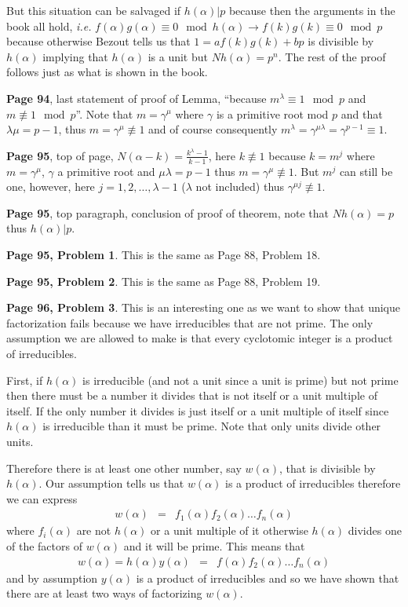 \documentclass[aps,preprint,preprintnumbers,nofootinbib,showpacs,prd]{revtex4-1}
\newcommand{\ie}{{\it i.e.} }
\newcommand{\nbea}{\begin{eqnarray*}}
\newcommand{\neea}{\end{eqnarray*}}
\begin{document}
But this situation can be salvaged if $h(\alpha)|p$ because then the arguments in the book all hold, \ie $f(\alpha)g(\alpha) \equiv 0 \mod{h(\alpha)} \to f(k)g(k) \equiv 0 \mod{p}$ because otherwise Bezout tells us that $1 = af(k)g(k) + bp$ is divisible by $h(\alpha)$ implying that $h(\alpha)$ is a unit but $Nh(\alpha) = p^n$. The rest of the proof follows just as what is shown in the book.

{\bf Page 94}, last statement of proof of Lemma, ``because $m^\lambda \equiv 1 \mod{p}$ and $m\not\equiv 1 \mod{p}$''. Note that $m = \gamma^\mu$ where $\gamma$ is a primitive root mod $p$ and that $\lambda\mu = p - 1$, thus $m = \gamma^\mu \not\equiv 1$ and of course consequently $m^\lambda = \gamma^{\mu\lambda} = \gamma^{p-1} \equiv 1$.

{\bf Page 95}, top of page, $N(\alpha - k) = \frac{k^\lambda - 1}{k-1}$, here $k \not \equiv 1$ because $k = m^j$ where $m = \gamma^\mu$, $\gamma$ a primitive root and $\mu\lambda = p-1$ thus $m = \gamma^\mu \not\equiv 1$. But $m^j$ can still be one, however, here $j = 1,2,\dots,\lambda - 1$ ($\lambda$ not included) thus $\gamma^{\mu j} \not\equiv 1$.

{\bf Page 95}, top paragraph, conclusion of proof of theorem, note that $Nh(\alpha) = p$ thus $h(\alpha)|p$.

{\bf Page 95, Problem 1}. This is the same as Page 88, Problem 18.

{\bf Page 95, Problem 2}. This is the same as Page 88, Problem 19.

{\bf Page 96, Problem 3}. This is an interesting one as we want to show that unique factorization fails because we have irreducibles that are not prime. The only assumption we are allowed to make is that every cyclotomic integer is a product of irreducibles.

First, if $h(\alpha)$ is irreducible (and not a unit since a unit is prime) but not prime then there must be a number it divides that is not itself or a unit multiple of itself. If the only number it divides is just itself or a unit multiple of itself since $h(\alpha)$ is irreducible than it must be prime. Note that only units divide other units.

Therefore there is at least one other number, say $w(\alpha)$, that is divisible by $h(\alpha)$. Our assumption tells us that $w(\alpha)$ is a product of irreducibles therefore we can express
%
\nbea
w(\alpha) & = & f_1(\alpha) f_2(\alpha) \dots f_n(\alpha)
\neea
%
where $f_i(\alpha)$ are not $h(\alpha)$ or a unit multiple of it otherwise $h(\alpha)$ divides one of the factors of $w(\alpha)$ and it will be prime. This means that
%
\nbea
w(\alpha) = h(\alpha)y(\alpha) & = & f(\alpha) f_2(\alpha) \dots f_n(\alpha)
\neea
%
and by assumption $y(\alpha)$ is a product of irreducibles and so we have shown that there are at least two ways of factorizing $w(\alpha)$.
\end{document}
